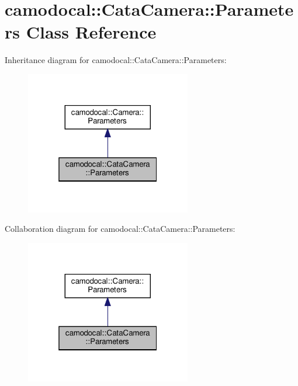 \hypertarget{classcamodocal_1_1CataCamera_1_1Parameters}{}\section{camodocal\+:\+:Cata\+Camera\+:\+:Parameters Class Reference}
\label{classcamodocal_1_1CataCamera_1_1Parameters}


Inheritance diagram for camodocal\+:\+:Cata\+Camera\+:\+:Parameters\+:\nopagebreak
\begin{figure}[H]
\begin{center}
\leavevmode
\includegraphics[width=205pt]{classcamodocal_1_1CataCamera_1_1Parameters__inherit__graph}
\end{center}
\end{figure}


Collaboration diagram for camodocal\+:\+:Cata\+Camera\+:\+:Parameters\+:\nopagebreak
\begin{figure}[H]
\begin{center}
\leavevmode
\includegraphics[width=205pt]{classcamodocal_1_1CataCamera_1_1Parameters__coll__graph}
\end{center}
\end{figure}
